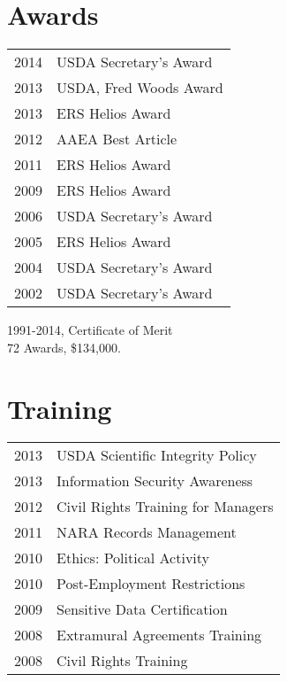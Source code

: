 \documentclass[]{deedy-resume-openfont}
\begin{document}
\begin{minipage}[t]{0.33\textwidth}
\section{Awards} 
\begin{tabular}{rl}
2014	     & USDA Secretary's Award\\
2013	     & USDA, Fred Woods Award\\
2013	     & ERS Helios Award\\  
2012	     & AAEA Best Article\\
2011	     & ERS Helios Award\\  
2009	     & ERS Helios Award\\  
2006         & USDA Secretary's Award\\
2005	     & ERS Helios Award\\
2004         & USDA Secretary's Award\\
2002         & USDA Secretary's Award\\
\end{tabular}
{\footnotesize 1991-2014, Certificate of Merit\\
72 Awards, \$134,000.}

\sectionsep


\section{Training}
{\footnotesize 
\begin{tabular}{rl}
2013	     & USDA Scientific Integrity Policy \\
2013	     & Information Security Awareness\\
2012         & Civil Rights Training for Managers\\
2011         & NARA Records Management\\
2010         & Ethics: Political Activity\\
2010         & Post-Employment Restrictions\\
2009		 & Sensitive Data Certification\\
2008         & Extramural Agreements Training\\
2008         & Civil Rights Training\\

\end{tabular}
}

\sectionsep


\end{minipage}
\end{document}
